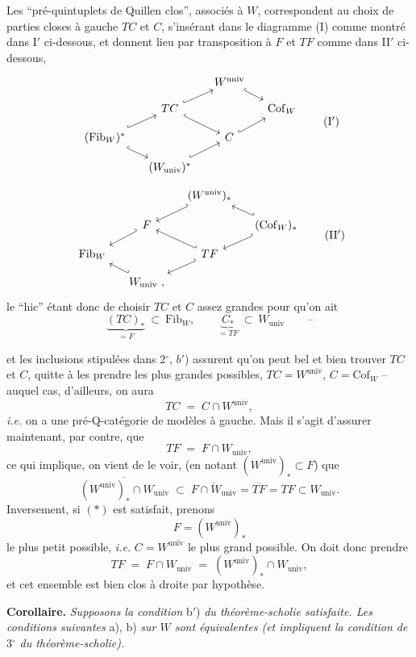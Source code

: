 \documentclass[11pt]{article}
\newcommand{\printedpage}[1]{\marginpar{\footnotesize p.~#1}}
\newcommand{\msp}[1]{\marginpar{\footnotesize [#1]}}
\newcommand{\Cof}{\mathrm{Cof}}
\newcommand{\Fib}{\mathrm{Fib}}
\newcommand{\univ}{\mathrm{univ}}
\begin{document}
Les “pré-quintuplets de Quillen clos”, associés à $W$, correspondent au choix de parties closes à gauche $TC$ et $C$, s'insérant dans le diagramme (I) comme montré dans I$'$ ci-dessous, et donnent lieu par transposition à $F$ et $TF$ comme dans II$'$ ci-dessous,
\[
\begin{tikzcd}[column sep=small, row sep=small]
 & & W^{\univ} \arrow[dr, hook] & \\
 & TC \arrow[ur, hook] \arrow[dr, hook] & & \Cof_W \\
(\Fib_W)^* \arrow[ur, hook] \arrow[dr, hook] & & C \arrow[ur, hook] & \\
 & (W_{\univ})^* \arrow[ur, hook] & &
\end{tikzcd}
\tag*{(I$'$)}
\]
\[
\begin{tikzcd}[column sep=small, row sep=small]
 & & (W^{\univ})_* \arrow[dl, hook'] & \\
 & F \arrow[dl, hook'] & & (\Cof_W)_* \arrow[ul, hook'] \arrow[dl, hook'] \\
\Fib_W & & TF \arrow[ul, hook'] \arrow[dl, hook'] & \\
 & W_{\univ}\ , \arrow[ul, hook'] & &
\end{tikzcd}
\tag*{(II$'$)}
\]
le “hic” étant donc de choisir $TC$ et $C$ assez grandes pour qu'on ait
\[ \underbrace{(TC)_*}_{= F} \ \subset\ \Fib_W, \qquad \underbrace{C_*}_{= TF} \ \subset\ W_{\univ} \qquad \text{--} \]

\printedpage{14}

\msp{page 24}
\noindent et les inclusions stipulées dans 2$^\circ$, $b'$) assurent qu'on peut bel et bien trouver $TC$ et $C$, quitte à les prendre les plus grandes possibles, $TC = W^{\univ}$, $C = \Cof_W$ -- auquel cas, d'ailleurs, on aura
\[
TC \;=\; C \cap W^{\univ},
\]
\textit{i.e.} on a une pré-Q-catégorie de modèles à gauche. Mais il s'agit d'assurer maintenant, par contre, que
\[
TF \;=\; F \cap W_{\univ},
\]
ce qui implique, on vient de le voir, (en notant $(W^{\univ})_* \subset F$) que
\[
\overline{(W^{\univ})_* \cap W_{\univ}} \;\subset\; \overline{F \cap W_{\univ}} = \overline{TF} = TF \subset W_{\univ}. \tag*{$(*)$}
\]
Inversement, si $(*)$ est satisfait, prenons
\[
F = (W^{\univ})_*
\]
le plus petit possible, \textit{i.e.} $C = W^{\univ}$ le plus grand possible. On doit donc prendre
\[
TF \;=\; F \cap W_{\univ} \;=\; (W^{\univ})_* \cap W_{\univ},
\]
et cet ensemble est bien clos à droite par hypothèse.

\textbf{Corollaire.} \textit{Supposons la condition} b$'$) \textit{du théorème-scholie satisfaite. Les conditions suivantes} a), b) \textit{sur $W$ sont équivalentes (et impliquent la condition de} 3$^\circ$ \textit{du théorème-scholie).}
\end{document}
